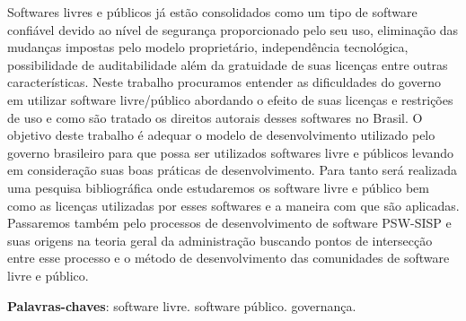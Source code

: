 \begin{resumo}
 
Softwares livres e públicos já estão consolidados como um tipo de software confiável 
devido ao nível de segurança proporcionado pelo seu uso, eliminação das mudanças
impostas pelo modelo proprietário, independência tecnológica, possibilidade de
auditabilidade além da gratuidade de suas licenças entre outras características.
%
Neste trabalho procuramos entender as dificuldades do governo em utilizar software
livre/público abordando o efeito de suas licenças e restrições de uso e como são 
tratado os direitos autorais desses softwares no Brasil.
%
O objetivo deste trabalho é adequar o modelo de desenvolvimento utilizado pelo
governo brasileiro para que possa ser utilizados softwares livre e públicos 
levando em consideração suas boas práticas de desenvolvimento.
%
Para tanto será realizada uma pesquisa bibliográfica onde estudaremos os software
livre e público bem como as licenças utilizadas por esses softwares e a maneira 
com que são aplicadas. Passaremos também pelo processos de desenvolvimento de software
PSW-SISP e suas origens na teoria geral da administração buscando pontos de intersecção
entre esse processo e o método de desenvolvimento das comunidades de software livre e 
público.  

 \vspace{\onelineskip}
    
 \noindent
 \textbf{Palavras-chaves}: software livre. software público. governança.
\end{resumo}
